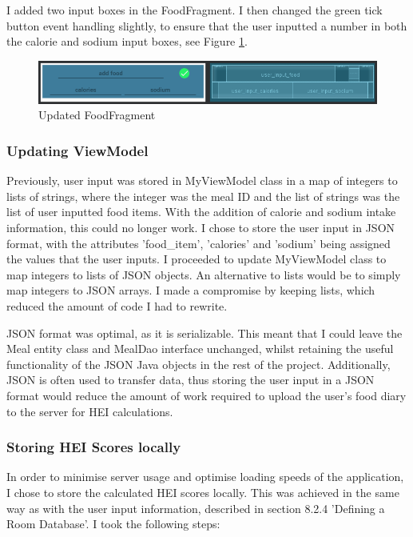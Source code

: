 \documentclass{article}
\begin{document}
\bigskip
\noindent I added two input boxes in the FoodFragment. I then changed the green tick button event handling slightly, to ensure that the user inputted a number in both the calorie and sodium input boxes, see Figure  \ref{fig:updated_food_fragment}.

\begin{figure}[h]
    \centering
    \includegraphics[width = 12cm]{food_fragment_updated.png}
    \caption{Updated FoodFragment}
    \label{fig:updated_food_fragment}
\end{figure}

\subsubsection{Updating ViewModel}
Previously, user input was stored in MyViewModel class in a map of integers to lists of strings, where the integer was the meal ID and the list of strings was the list of user inputted food items. With the addition of calorie and sodium intake information, this could no longer work. I chose to store the user input in JSON format, with the attributes 'food\_item', 'calories' and 'sodium' being assigned the values that the user inputs. I proceeded to update MyViewModel class to map integers to lists of JSON objects. An alternative to lists would be to simply map integers to JSON arrays. I made a compromise by keeping lists, which reduced the amount of code I had to rewrite. 

\bigskip
\noindent JSON format was optimal, as it is serializable. This meant that I could leave the Meal entity class and MealDao interface unchanged, whilst retaining the useful functionality of the JSON Java objects in the rest of the project. Additionally, JSON is often used to transfer data, thus storing the user input in a JSON format would reduce the amount of work required to upload the user's food diary to the server for HEI calculations. 

\subsubsection{Storing HEI Scores locally}
In order to minimise server usage and optimise loading speeds of the application, I chose to store the calculated HEI scores locally. This was achieved in the same way as with the user input information, described in section 8.2.4 'Defining a Room Database'. I took the following steps: 
\end{document}
